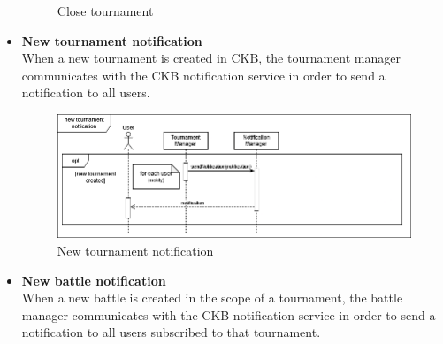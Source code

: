 \begin{itemize}
\begin{figure}[h]
        \caption{Close tournament}
        \label{fig:Close tournament}
    \end{figure}
    \newpage
    \item \textbf{New tournament notification}\\
    When a new tournament is created in CKB, the tournament manager communicates with the CKB notification service 	in order to send a notification to all users.
    \begin{figure}[h]
        \centering
        \includegraphics[width=1\linewidth]{src/New tournament notification.png}
        \caption{New tournament notification}
        \label{fig:New tournament notification}
    \end{figure}
    \item \textbf{New battle notification}\\
    When a new battle is created in the scope of a tournament, the battle manager communicates with the CKB notification service in order to send a notification to all users subscribed to that 
    tournament.


\end{itemize}
